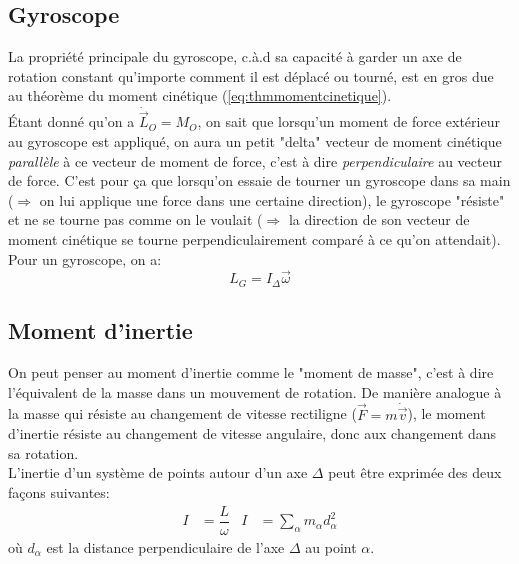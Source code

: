\documentclass{article}
\numberwithin{equation}{section}
\begin{document}
\subsection{Gyroscope}
La propriété principale du gyroscope, c.à.d sa capacité à garder un axe de rotation constant qu'importe comment il est déplacé ou tourné, est en gros due au théorème du moment cinétique (\ref{eq:thmmomentcinetique}). \\

Étant donné qu'on a \( \dot{\vec L}_O = M_O\), on sait que lorsqu'un moment de force extérieur au gyroscope est appliqué, on aura un petit "delta" vecteur de moment cinétique \emph{parallèle} à ce vecteur de moment de force, c'est à dire \emph{perpendiculaire} au vecteur de force. C'est pour ça que lorsqu'on essaie de tourner un gyroscope dans sa main (\(\Rightarrow\) on lui applique une force dans une certaine direction), le gyroscope "résiste" et ne se tourne pas comme on le voulait (\(\Rightarrow\) la direction de son vecteur de moment cinétique se tourne perpendiculairement comparé à ce qu'on attendait). \\

Pour un gyroscope, on a:
\begin{equation}
	L_G = I_\Delta \vec \omega
\end{equation}

\subsection{Moment d'inertie}
On peut penser au moment d'inertie comme le "moment de masse", c'est à dire l'équivalent de la masse dans un mouvement de rotation. De manière analogue à la masse qui résiste au changement de vitesse rectiligne (\(\vec F = m \dot{\vec v}\)), le moment d'inertie résiste au changement de vitesse angulaire, donc aux changement dans sa rotation. \\

L'inertie d'un système de points autour d'un axe \(\Delta\) peut être exprimée des deux façons suivantes:
\begin{align*}
	I &= \dfrac{L}{\omega} & I &= \sum_\alpha m_\alpha d_\alpha^2
\end{align*}
où \(d_\alpha\) est la distance perpendiculaire de l'axe \(\Delta\) au point \(\alpha\).
\end{document}
